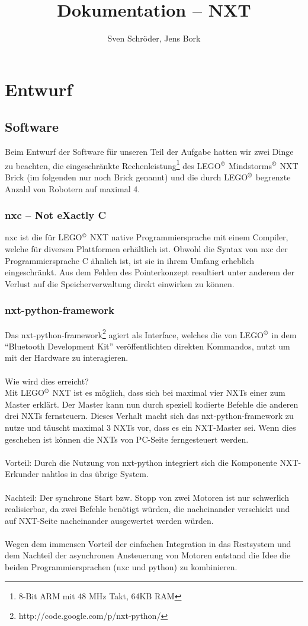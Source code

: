 \documentclass[10pt,a4paper]{scrartcl}
\author{Sven Schröder, Jens Bork}
\title{Dokumentation -- NXT}
\begin{document}
\maketitle
\tableofcontents
\section{Entwurf}
\subsection{Software}
Beim Entwurf der Software für unseren Teil der Aufgabe hatten wir zwei Dinge zu beachten, die eingeschränkte Rechenleistung\footnote{8-Bit ARM mit 48 MHz Takt, 64KB RAM} des LEGO$^\copyright$ Mindstorms$^\copyright$ NXT Brick (im folgenden nur noch Brick genannt) und die durch LEGO$^\copyright$ begrenzte Anzahl von Robotern auf maximal 4. 
\subsubsection{nxc -- Not eXactly C}
nxc ist die für LEGO$^\copyright$ NXT native Programmiersprache mit einem Compiler, welche für diversen Plattformen erhältlich ist. Obwohl die Syntax von nxc der Programmiersprache C ähnlich ist, ist sie in ihrem Umfang erheblich eingeschränkt. Aus dem Fehlen des Pointerkonzept resultiert unter anderem der Verlust auf die Speicherverwaltung direkt einwirken zu können.
\subsubsection{nxt-python-framework}
Das nxt-python-framework\footnote{http://code.google.com/p/nxt-python/} agiert als Interface, welches die von LEGO$^\copyright$ in dem "`Bluetooth Development Kit"' veröffentlichten direkten Kommandos, nutzt um mit der Hardware zu interagieren.\\
\\
Wie wird dies erreicht?\\
Mit LEGO$^\copyright$ NXT ist es möglich, dass sich bei maximal vier NXTs einer zum Master erklärt. Der Master kann nun durch speziell kodierte Befehle die anderen drei NXTs fernsteuern. Dieses Verhalt macht sich das nxt-python-framework zu nutze und täuscht maximal 3 NXTs vor, dass es ein NXT-Master sei. Wenn dies geschehen ist können die NXTs von PC-Seite ferngesteuert werden.\\
\\
Vorteil: Durch die Nutzung von nxt-python integriert sich die Komponente NXT-Erkunder nahtlos in das übrige System.\\
\\
Nachteil: Der synchrone Start bzw. Stopp von zwei Motoren ist nur schwerlich realisierbar, da zwei Befehle benötigt würden, die nacheinander verschickt und auf NXT-Seite nacheinander ausgewertet werden würden. \\
\\
Wegen dem immensen Vorteil der einfachen Integration in das Restsystem und dem Nachteil der asynchronen Ansteuerung von Motoren entstand die Idee die beiden Programmiersprachen (nxc und python) zu kombinieren.
\end{document}
